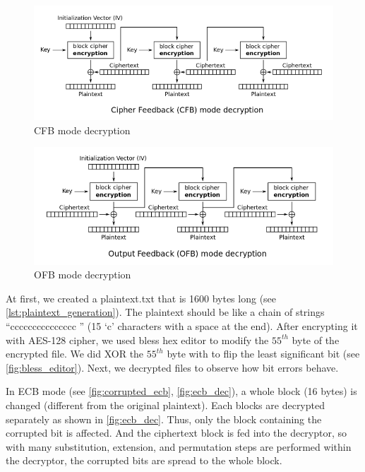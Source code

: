 \begin{figure}
    \centering
    \includegraphics[height=\textheight,width=\textwidth,keepaspectratio]
    {figures/cfb_decryption.png}
    \caption{CFB mode decryption}\label{fig:cfb_dec}
\end{figure}

\begin{figure}
    \centering
    \includegraphics[height=\textheight,width=\textwidth,keepaspectratio]
    {figures/ofb_decryption.png}
    \caption{OFB mode decryption}\label{fig:ofb_dec}
\end{figure}

At first, we created a {\selectfont plaintext.txt} that is 1600 bytes long
(see \autoref{lst:plaintext_generation}). The plaintext should be like a chain of strings
``ccccccccccccccc '' (15 `c' characters with a space at the end).
After encrypting it with AES-128 cipher, we used
{\selectfont bless} hex editor to modify the \(55^{th}\) byte of the
encrypted file. We did XOR the \(55^{th}\) byte with {}
to flip the least significant bit (see \autoref{fig:bless_editor}). Next, we decrypted
files to observe how bit errors behave.

In ECB mode (see \autoref{fig:corrupted_ecb}, \autoref{fig:ecb_dec}), a whole block (16 bytes)
is changed (different
from the original plaintext). Each blocks are decrypted separately as shown in
\autoref{fig:ecb_dec}. Thus, only the block containing the corrupted bit is affected. And
the ciphertext block is fed into the decryptor, so with many substitution, extension, and
permutation steps are performed within the decryptor, the corrupted bits are spread to the
whole block.

